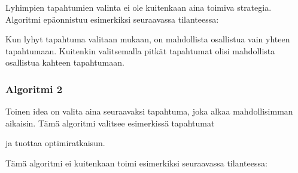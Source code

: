 Lyhimpien tapahtumien valinta ei ole kuitenkaan
aina toimiva strategia.
Algoritmi epäonnistuu esimerkiksi seuraavassa tilanteessa:
\\
\begin{center}
\end{center}

Kun lyhyt tapahtuma valitaan mukaan,
on mahdollista osallistua vain yhteen tapahtumaan.
Kuitenkin valitsemalla pitkät tapahtumat
olisi mahdollista osallistua kahteen tapahtumaan.

\subsubsection*{Algoritmi 2}

Toinen idea on valita aina seuraavaksi tapahtuma,
joka alkaa mahdollisimman aikaisin.
Tämä algoritmi valitsee esimerkissä tapahtumat
\\
\begin{center}
\end{center}
ja tuottaa optimiratkaisun.

Tämä algoritmi ei kuitenkaan toimi
esimerkiksi seuraavassa tilanteessa:
\\
\begin{center}
\end{center}

